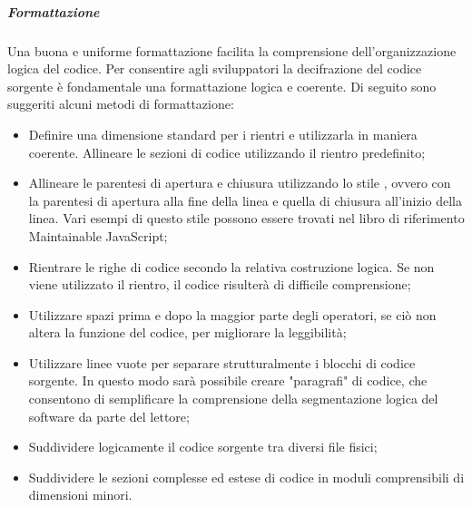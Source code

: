 \documentclass[../NormeDiProgetto_v3.0.0.tex]{subfiles}
\begin{document}
                  \subparagraph{Formattazione}
                  Una buona e uniforme formattazione facilita la comprensione dell'organizzazione logica del codice. Per consentire agli sviluppatori la decifrazione del codice sorgente è fondamentale una formattazione logica e coerente.
                  Di seguito sono suggeriti alcuni metodi di formattazione:
                  \begin{itemize}
                        \item Definire una dimensione standard per i rientri e utilizzarla in maniera coerente. Allineare le sezioni di codice utilizzando il rientro predefinito;
                        \item Allineare le parentesi di apertura e chiusura utilizzando lo stile , ovvero con la parentesi di apertura alla fine della linea e quella di chiusura all'inizio della linea. Vari esempi di questo stile possono essere trovati nel libro di riferimento Maintainable JavaScript;
                        \item Rientrare le righe di codice secondo la relativa costruzione logica. Se non viene utilizzato il rientro, il codice risulterà di difficile comprensione;
                        \item Utilizzare spazi prima e dopo la maggior parte degli operatori, se ciò non altera la funzione del codice, per migliorare la leggibilità;
                        \item Utilizzare linee vuote per separare strutturalmente i blocchi di codice sorgente. In questo modo sarà possibile creare "paragrafi" di codice, che consentono di semplificare la comprensione della segmentazione logica del software da parte del lettore;
                        \item Suddividere logicamente il codice sorgente tra diversi file fisici;
                        \item Suddividere le sezioni complesse ed estese di codice in moduli comprensibili di dimensioni minori.
                  \end{itemize}
\end{document}
